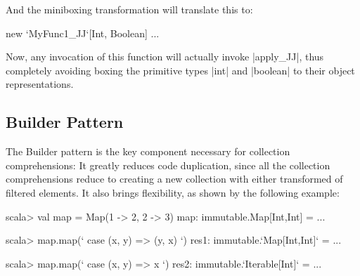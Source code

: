 And the miniboxing transformation will translate this to:

\begin{lstlisting-nobreak}
 new `MyFunc1_JJ`[Int, Boolean] { ... }
\end{lstlisting-nobreak}

Now, any invocation of this function will actually invoke |apply_JJ|, thus completely avoiding boxing the primitive types |int| and |boolean| to their object representations.

%

\subsection{Builder Pattern}

The Builder pattern is the key component necessary for collection comprehensions: It greatly reduces code duplication, since all the collection comprehensions reduce to creating a new collection with either transformed of filtered elements. It also brings flexibility, as shown by the following example:

\begin{lstlisting-nobreak}
scala> val map = Map(1 -> 2, 2 -> 3)
map: immutable.Map[Int,Int] = ...

scala> map.map(`{ case (x, y) => (y, x) }`)
res1: immutable.`Map[Int,Int]` = ...

scala> map.map(`{ case (x, y) => x }`)
res2: immutable.`Iterable[Int]` = ...
\end{lstlisting-nobreak}


%

